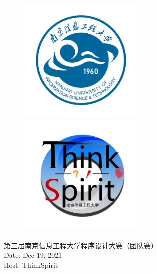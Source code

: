 \begin{titlepage}
    \begin{figure}[H]
        \centering
        \includegraphics[height=6cm,width=6cm]{src/Logo-NUIST.png}
        \includegraphics[height=6cm,width=6cm]{src/ThinkSpirit.jpg}
    \end{figure}
    {
        \centering
        {\LARGE 第三届南京信息工程大学程序设计大赛（团队赛）} \\
        \vspace{0.5cm}
        {\Large Date: Dec 19, 2021} \\
        \vspace{0.5cm}
        {\Large Host: ThinkSpirit} \\
        
        \tableofcontents
        \thispagestyle{empty}
    }
    \vspace{1cm}
\end{titlepage}
\restoregeometry